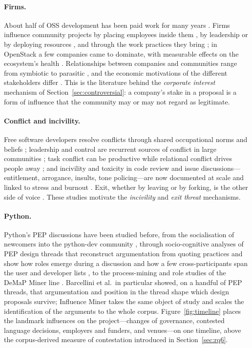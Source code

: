 \documentclass[sigconf,screen]{acmart}
\begin{document}
\paragraph{Firms.} About half of OSS development has been paid work for many years \cite{riehle2014}. Firms influence community projects by placing employees inside them \cite{dahlander2006}, by leadership or by deploying resources \cite{schaarschmidt2015}, and through the work practices they bring \cite{butler2018}; in OpenStack a few companies came to dominate, with measurable effects on the ecosystem's health \cite{zhang2021, zhang2022}. Relationships between companies and communities range from symbiotic to parasitic \cite{dahlander2005}, and the economic motivations of the different stakeholders differ \cite{riehle2007}. This is the literature behind the \emph{corporate interest} mechanism of Section~\ref{sec:controversial}: a company's stake in a proposal is a form of influence that the community may or may not regard as legitimate.

\paragraph{Conflict and incivility.} Free software developers resolve conflicts through shared occupational norms and beliefs \cite{elliott2003}; leadership and control are recurrent sources of conflict in large communities \cite{jensen2004}; task conflict can be productive while relational conflict drives people away \cite{filippova2016}; and incivility and toxicity in code review and issue discussions---entitlement, arrogance, insults, tone policing---are now documented at scale \cite{ferreira2021, miller2022, squire2015} and linked to stress and burnout \cite{raman2020}. Exit, whether by leaving or by forking, is the other side of voice \cite{hirschman1970, robles2012, gamalielsson2014}. These studies motivate the \emph{incivility} and \emph{exit threat} mechanisms.

\paragraph{Python.} Python's PEP discussions have been studied before, from the socialisation of newcomers into the python-dev community \cite{ducheneaut2005}, through socio-cognitive analyses of PEP design threads that reconstruct argumentation from quoting practices and show how roles emerge during a discussion \cite{sack2006, barcellini2008b} and how a few cross-participants span the user and developer lists \cite{barcellini2008a}, to the process-mining and role studies of the DeMaP Miner line \cite{keertipati2016, sharma2017, sharma2022demap, sharma2021roles}. Barcellini et al.\ in particular showed, on a handful of PEP threads, that argumentation and position in the thread shape which design proposals survive; Influence Miner takes the same object of study and scales the identification of the arguments to the whole corpus. Figure~\ref{fig:timeline} places the landmark influences on the project---changes of governance, contested language decisions, employers and funders, and venues---on one timeline, above the corpus-derived measure of contestation introduced in Section~\ref{sec:rq6}.
\end{document}
